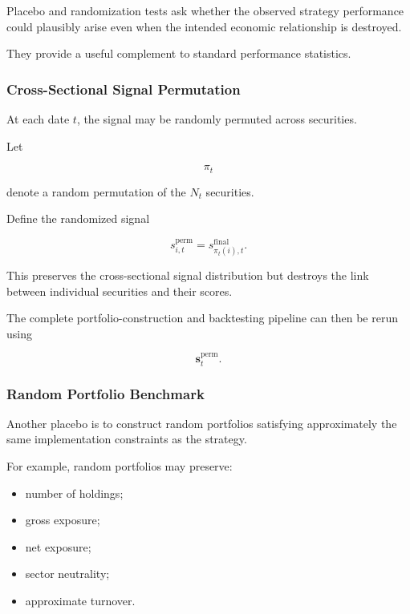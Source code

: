 \documentclass[11pt,a4paper]{article}
\begin{document}
Placebo and randomization tests ask whether the observed strategy performance
could plausibly arise even when the intended economic relationship is
destroyed.

They provide a useful complement to standard performance statistics.


\subsubsection{Cross-Sectional Signal Permutation}

At each date $t$, the signal may be randomly permuted across securities.

Let

\begin{equation}
\pi_t
\end{equation}

denote a random permutation of the $N_t$ securities.

Define the randomized signal

\begin{equation}
\boxed{
s_{i,t}^{\mathrm{perm}}
=
s_{\pi_t(i),t}^{\mathrm{final}}.
}
\end{equation}

This preserves the cross-sectional signal distribution but destroys the link
between individual securities and their scores.

The complete portfolio-construction and backtesting pipeline can then be rerun
using

\begin{equation}
\mathbf{s}_t^{\mathrm{perm}}.
\end{equation}


\subsubsection{Random Portfolio Benchmark}

Another placebo is to construct random portfolios satisfying approximately the
same implementation constraints as the strategy.

For example, random portfolios may preserve:

\begin{itemize}
    \item number of holdings;
    \item gross exposure;
    \item net exposure;
    \item sector neutrality;
    \item approximate turnover.
\end{itemize}
\end{document}

